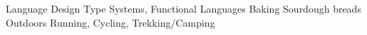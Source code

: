 \begin{cvinterests}

  \cvskill
    {Language Design}
    {Type Systems, Functional Languages}
  \cvskill
    {Baking}
    {Sourdough breads}
  \cvskill
    {Outdoors}
    {Running, Cycling, Trekking/Camping}
\end{cvinterests}
